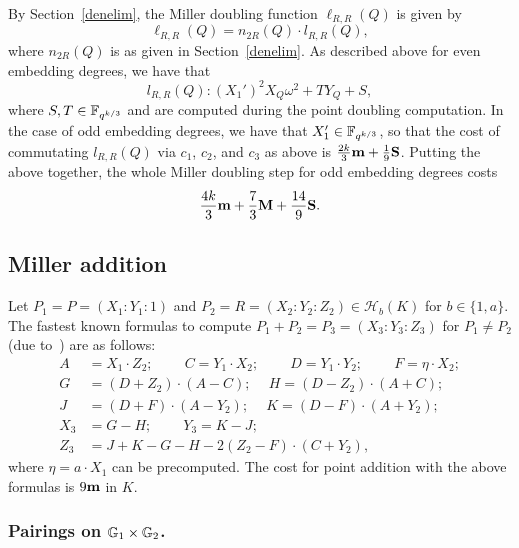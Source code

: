 By Section~\ref{denelim}, the Miller doubling function $\ell_{R,R}(Q)$ is given by
\[\ell_{R,R}(Q) = n_{2R}(Q) \cdot l_{R,R}(Q),\]
where $n_{2R}(Q)$ is as given in Section~\ref{denelim}.
As described above for even embedding degrees, we have that
\[l_{R,R}(Q): (X_1')^2X_Q\omega^2 + T Y_Q + S,\]
where $S,T \in \mathbb{F}_{q^{k/3}}$ and are computed during the point doubling computation. 
In the case of odd embedding degrees, we have that $X_1' \in \mathbb{F}_{q^{k/3}}$,
so that the cost of commutating $l_{R,R}(Q)$ via $c_1$, $c_2$, and $c_3$ as above is
$\frac{2k}{3}\textbf{m} + \frac{1}{9}\textbf{S}$.
%
Putting the above together, the whole Miller doubling step
for odd embedding degrees costs
$$\frac{4k}{3}\textbf{m} + \frac{7}{3}\textbf{M} + \frac{14}{9}\textbf{S}.$$

\subsection{Miller addition}

Let $P_1 = P = (X_1:Y_1:1)$ and $P_2 = R = (X_2:Y_2:Z_2) \in \mathcal{H}_b(K)$ for $b \in \{1,a\}$.
The fastest known formulas to compute $P_1 + P_2 = P_3 = (X_3:Y_3:Z_3)$
for $P_1 \neq P_2$ (due to~\cite{2010/hisil-thesis}) are as follows:
\begin{align*}
A &= X_1 \cdot Z_2;\	\qquad
C = Y_1 \cdot X_2;\	\qquad
D = Y_1 \cdot Y_2;\	\qquad
F = \eta \cdot X_2;\\
G &= (D + Z_2) \cdot (A - C);\	\quad
H = (D - Z_2) \cdot (A + C);\\
J &= (D + F) \cdot (A - Y_2);\	\quad
K = (D - F) \cdot (A + Y_2);\\
X_3 &= G - H;\	\qquad
Y_3 = K - J;\\
Z_3 &= J + K - G - H - 2(Z_2 - F) \cdot (C + Y_2),
\end{align*}
where $\eta = a\cdot X_1$ can be precomputed.
The cost for point addition with the above formulas is $9\textbf{m}$ in $K$.

\subsubsection{Pairings on $\mathbb{G}_{1} \times \mathbb{G}_{2}$.}

